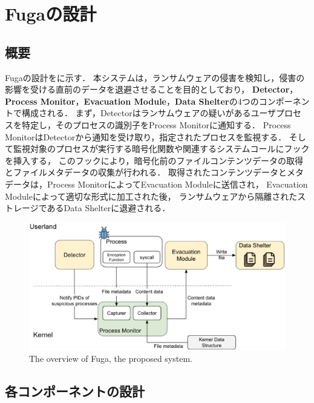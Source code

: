 \chapter{Fugaの設計}
\label{chap:design}

\section{概要}
Fugaの設計をに示す．
本システムは，ランサムウェアの侵害を検知し，侵害の影響を受ける直前のデータを退避させることを目的としており，
\textbf{Detector}，\textbf{Process Monitor}，\textbf{Evacuation Module}，\textbf{Data Shelter}の4つのコンポーネントで構成される．
まず，Detectorはランサムウェアの疑いがあるユーザプロセスを特定し，そのプロセスの識別子をProcess Monitorに通知する．
Process MonitorはDetectorから通知を受け取り，指定されたプロセスを監視する．
そして監視対象のプロセスが実行する暗号化関数や関連するシステムコールにフックを挿入する，
このフックにより，暗号化前のファイルコンテンツデータの取得とファイルメタデータの収集が行われる．
取得されたコンテンツデータとメタデータは，Process MonitorによってEvacuation Moduleに送信され，
Evacuation Moduleによって適切な形式に加工された後，
ランサムウェアから隔離されたストレージであるData Shelterに退避される．

\begin{figure}[t]
  \centering
  \includegraphics[width=\columnwidth]{doc/img/system_overview.eps}
  \caption{The overview of Fuga, the proposed system.}
  \label{fig:system-architecture}
\end{figure}

\section{各コンポーネントの設計}
